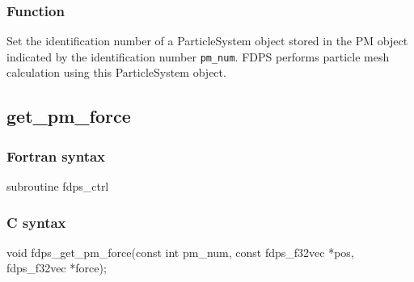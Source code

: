 \subsubsection*{Function}
Set the identification number of a ParticleSystem object stored in the PM object indicated by the identification number \texttt{pm\_num}. FDPS performs particle mesh calculation using this ParticleSystem object.
\clearpage

\subsection{get\_pm\_force}
\subsubsection*{Fortran syntax}
\begin{screen}
\begin{spverbatim}
subroutine fdps_ctrl%
\end{spverbatim}
\end{screen}

\subsubsection*{C syntax}
\begin{screen}
\begin{spverbatim}
void fdps_get_pm_force(const int pm_num,
                       const fdps_f32vec *pos,
                       fdps_f32vec *force);
\end{spverbatim}
\end{screen}


